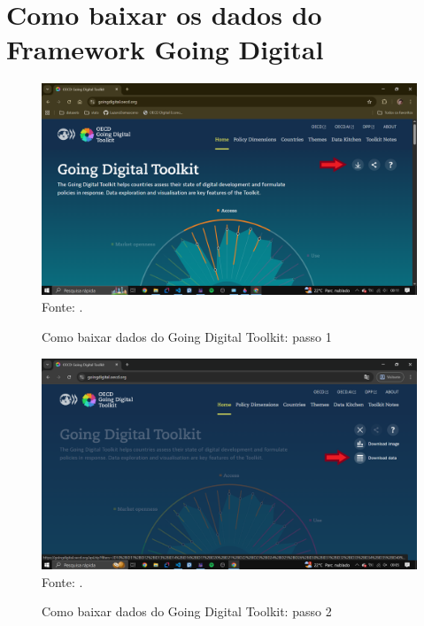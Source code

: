 \chapter{Como baixar os dados do Framework Going Digital}
\label{como_baixar_dados_going_digital}

\begin{figure}[H]
	\centering
	\caption{Como baixar dados do Going Digital Toolkit: passo 1}
	\includegraphics[width=1\linewidth]{figuras/primeiro_passo}
	\label{fig:primeiro_passo}
	\footnotesize{Fonte: \cite{portal_going_digital}.}
\end{figure}

\begin{figure}[H]
	\centering
	\caption{Como baixar dados do Going Digital Toolkit: passo 2}
	\includegraphics[width=1\linewidth]{figuras/segundo_passo}
	\label{fig:segundo_passo}
	\footnotesize{Fonte: \cite{portal_going_digital}.}
\end{figure}
